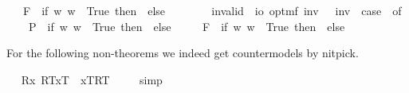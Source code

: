 \begin{isabellebody}
\ \ {\isacharbar}\ F{\isacharparenleft}{\isasympsi}{\isacharparenright}\ {\isasymRightarrow}\ if\ {\isasymexists}w{\isachardot}{\isasymnot}{\isacharparenleft}{\isasympsi}\ w{\isacharparenright}\ {\isasymlongleftrightarrow}\ True\ then\ {\isasymtop}\ else\ {\isasymbottom}\ {\isacharbar}\ {\isacharunderscore}\ {\isasymRightarrow}\ {\isacharasterisk}{\isachardoublequoteclose}\isanewline
\ \isamarkupfalse%
\ invalid\ {\isacharcolon}{\isacharcolon}\ {\isachardoublequoteopen}io\ opt{\isasymRightarrow}mf{\isachardoublequoteclose}\ {\isacharparenleft}{\isachardoublequoteopen}{\isacharbrackleft}{\isacharunderscore}{\isacharbrackright}\isactrlsup i\isactrlsup n\isactrlsup v{\isachardoublequoteclose}\ {\isacharbrackleft}{}{\isacharbrackright}{\isacharparenright}\ \ {\isachardoublequoteopen}{\isacharbrackleft}{\isasymphi}{\isacharbrackright}\isactrlsup i\isactrlsup n\isactrlsup v\ {\isasymequiv}\ case\ {\isasymphi}\ of\ \isanewline
\ \ \ \ P{\isacharparenleft}{\isasympsi}{\isacharparenright}\ {\isasymRightarrow}\ if\ {\isasymforall}w{\isachardot}{\isasymnot}{\isacharparenleft}{\isasympsi}\ w{\isacharparenright}\ {\isasymlongleftrightarrow}\ True\ then\ {\isasymtop}\ else\ {\isasymbottom}\ \isanewline
\ \ {\isacharbar}\ F{\isacharparenleft}{\isasympsi}{\isacharparenright}\ {\isasymRightarrow}\ if\ {\isasymforall}w{\isachardot}{\isasymnot}{\isacharparenleft}{\isasympsi}\ w{\isacharparenright}\ {\isasymlongleftrightarrow}\ True\ then\ {\isasymtop}\ else\ {\isasymbottom}\ {\isacharbar}\ {\isacharunderscore}\ {\isasymRightarrow}\ {\isacharasterisk}{\isachardoublequoteclose}%
\isamarkuptrue%
%
\isamarkuptrue%
%
\begin{isamarkuptext}%
For the following non-theorems we indeed get countermodels by nitpick.%
\end{isamarkuptext}%
\isamarkuptrue%
\ \isamarkupfalse%
\ {\isachardoublequoteopen}{\isacharbrackleft}{\isacharparenleft}\isactrlbold {\isasymforall}R{\isachardot}\isactrlbold {\isasymforall}x{\isachardot}\ {\isasymlparr}R\isactrlsup T{\isacharcomma}x\isactrlsup T{\isasymrparr}\ \isactrlbold {\isasymrightarrow}\ {\isasymlbrace}x\isactrlsup T{\isacharcomma}R\isactrlsup T{\isasymrbrace}{\isacharparenright}{\isacharbrackright}\ {\isacharequal}\ {\isasymtop}{\isachardoublequoteclose}%
\isadelimproof
\ %
\endisadelimproof
%
\isatagproof
{}\isamarkupfalse%
\ simp%
\endisatagproof
{\isafoldproof}%
%
\isadelimproof

\end{isabellebody}
